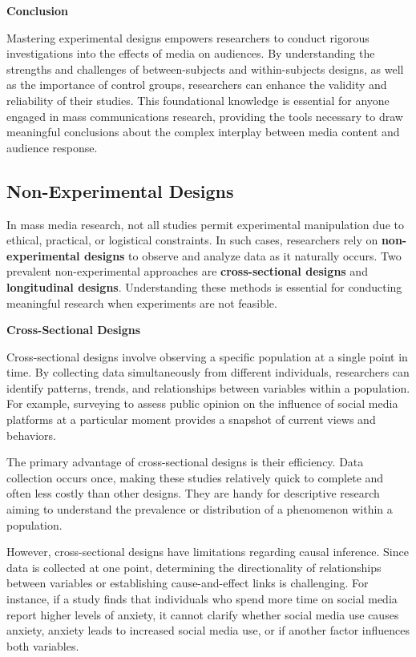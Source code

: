 \documentclass[
]{book}
\begin{document}
\textbf{Conclusion}

Mastering experimental designs empowers researchers to conduct rigorous investigations into the effects of media on audiences. By understanding the strengths and challenges of between-subjects and within-subjects designs, as well as the importance of control groups, researchers can enhance the validity and reliability of their studies. This foundational knowledge is essential for anyone engaged in mass communications research, providing the tools necessary to draw meaningful conclusions about the complex interplay between media content and audience response.

\subsection*{Non-Experimental Designs}\label{non-experimental-designs}

In mass media research, not all studies permit experimental manipulation due to ethical, practical, or logistical constraints. In such cases, researchers rely on \textbf{non-experimental designs} to observe and analyze data as it naturally occurs. Two prevalent non-experimental approaches are \textbf{cross-sectional designs} and \textbf{longitudinal designs}. Understanding these methods is essential for conducting meaningful research when experiments are not feasible.

\textbf{Cross-Sectional Designs}

Cross-sectional designs involve observing a specific population at a single point in time. By collecting data simultaneously from different individuals, researchers can identify patterns, trends, and relationships between variables within a population. For example, surveying to assess public opinion on the influence of social media platforms at a particular moment provides a snapshot of current views and behaviors.

The primary advantage of cross-sectional designs is their efficiency. Data collection occurs once, making these studies relatively quick to complete and often less costly than other designs. They are handy for descriptive research aiming to understand the prevalence or distribution of a phenomenon within a population.

However, cross-sectional designs have limitations regarding causal inference. Since data is collected at one point, determining the directionality of relationships between variables or establishing cause-and-effect links is challenging. For instance, if a study finds that individuals who spend more time on social media report higher levels of anxiety, it cannot clarify whether social media use causes anxiety, anxiety leads to increased social media use, or if another factor influences both variables.
\end{document}
